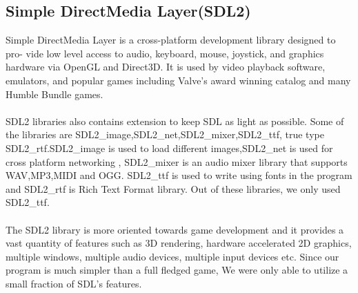 \documentclass[report.tex]{subfiles}
\begin{document}
\begin{large}
    \subsection{Simple DirectMedia Layer(SDL2)}
    Simple DirectMedia Layer is a cross-platform development library designed to pro-
    vide low level access to audio, keyboard, mouse, joystick, and graphics hardware
    via OpenGL and Direct3D. It is used by video playback software, emulators, and
    popular games including Valve’s award winning catalog and many Humble Bundle
    games.\\\\
    SDL2 libraries also contains extension to keep SDL as light as possible. Some of the
    libraries are SDL2\_image,SDL2\_net,SDL2\_mixer,SDL2\_ttf, true type SDL2\_rtf.SDL2\_image
    is used to load different images,SDL2\_net is used for cross platform networking
    , SDL2\_mixer is an audio mixer library that supports WAV,MP3,MIDI and OGG.
    SDL2\_ttf is used to write using fonts in the program and SDL2\_rtf is Rich Text Format
    library. Out of these libraries, we only used SDL2\_ttf.
    \\\\
    The SDL2 library is more oriented towards game development and it provides a vast quantity of features such as 3D rendering, hardware accelerated 2D graphics, multiple windows, multiple audio devices, multiple input devices etc. 
    Since our program is much simpler than a full fledged game, We were only able to utilize a small fraction of SDL's features.
\end{large}
\end{document}
